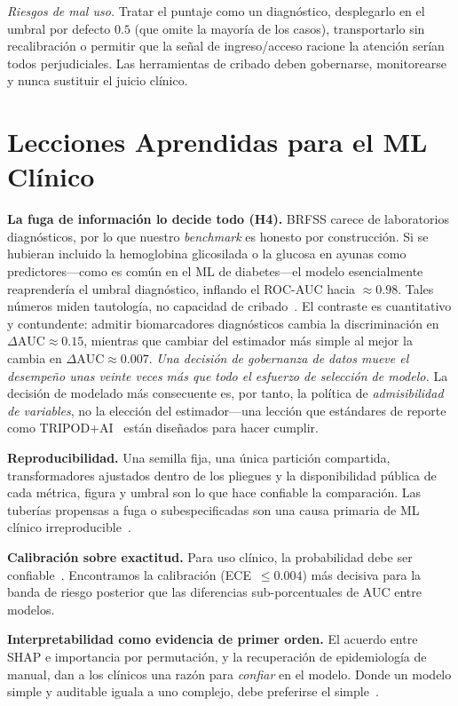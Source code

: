 \documentclass[conference]{IEEEtran}
\begin{document}
\emph{Riesgos de mal uso.} Tratar el puntaje como un diagnóstico, desplegarlo en el umbral
por defecto $0.5$ (que omite la mayoría de los casos), transportarlo sin recalibración o
permitir que la señal de ingreso/acceso racione la atención serían todos perjudiciales. Las
herramientas de cribado deben gobernarse, monitorearse y nunca sustituir el juicio clínico.

\section{Lecciones Aprendidas para el ML Clínico}
\label{sec:lessons}
\textbf{La fuga de información lo decide todo (H4).} BRFSS carece de laboratorios
diagnósticos, por lo que nuestro \emph{benchmark} es honesto por construcción. Si se hubieran
incluido la hemoglobina glicosilada o la glucosa en ayunas como predictores---como es común
en el ML de diabetes---el modelo esencialmente reaprendería el umbral diagnóstico, inflando
el ROC-AUC hacia $\approx0.98$. Tales números miden tautología, no capacidad de
cribado~\cite{kaufman2012leakage,kapoor2023leakage}. El contraste es cuantitativo y
contundente: admitir biomarcadores diagnósticos cambia la discriminación en
$\Delta\text{AUC}\approx0.15$, mientras que cambiar del estimador más simple al mejor la
cambia en $\Delta\text{AUC}\approx0.007$. \emph{Una decisión de gobernanza de datos mueve el
desempeño unas veinte veces más que todo el esfuerzo de selección de modelo.} La decisión de
modelado más consecuente es, por tanto, la política de \emph{admisibilidad de variables}, no
la elección del estimador---una lección que estándares de reporte como
TRIPOD+AI~\cite{collins2024tripod} están diseñados para hacer cumplir.

\textbf{Reproducibilidad.} Una semilla fija, una única partición compartida, transformadores
ajustados dentro de los pliegues y la disponibilidad pública de cada métrica, figura y umbral
son lo que hace confiable la comparación. Las tuberías propensas a fuga o subespecificadas
son una causa primaria de ML clínico irreproducible~\cite{kapoor2023leakage}.

\textbf{Calibración sobre exactitud.} Para uso clínico, la probabilidad debe ser
confiable~\cite{niculescu2005predicting,guo2017calibration}. Encontramos la calibración
(ECE~$\le0.004$) más decisiva para la banda de riesgo posterior que las diferencias
sub-porcentuales de AUC entre modelos.

\textbf{Interpretabilidad como evidencia de primer orden.} El acuerdo entre SHAP e
importancia por permutación, y la recuperación de epidemiología de manual, dan a los
clínicos una razón para \emph{confiar} en el modelo. Donde un modelo simple y auditable
iguala a uno complejo, debe preferirse el simple~\cite{rudin2019stop,caruana2015intelligible}.
\end{document}
